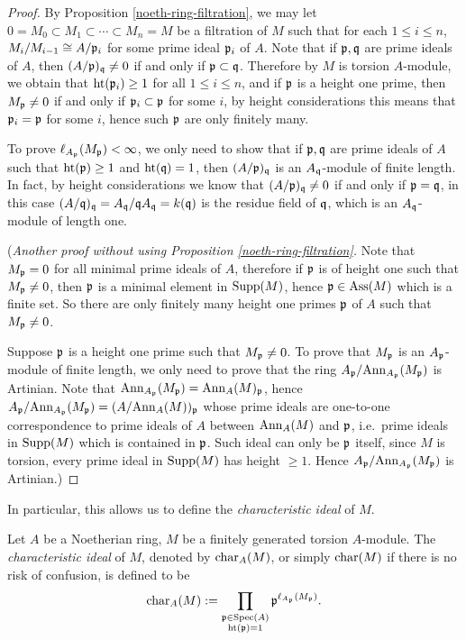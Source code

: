 \begin{proof}
By Proposition \ref{noeth-ring-filtration},
we may let $0=M_0\subset M_1\subset\cdots\subset M_n=M$ be a filtration of $M$
such that for each $1\leq i\leq n$,
$M_i/M_{i-1}\cong A/{\mathfrak{p}}_i$ for some prime ideal ${\mathfrak{p}}_i$ of $A$.
Note that if ${\mathfrak{p}},{\mathfrak{q}}$ are prime ideals of $A$,
then $(A/{\mathfrak{p}})_{\mathfrak{q}}\neq 0$ if and only if ${\mathfrak{p}}\subset{\mathfrak{q}}$.
Therefore by $M$ is torsion $A$-module, we obtain that ${\mathrm{ht}}({\mathfrak{p}}_i)\geq 1$
for all $1\leq i\leq n$,
and if ${\mathfrak{p}}$ is a height one prime, then $M_{\mathfrak{p}}\neq 0$
if and only if ${\mathfrak{p}}_i\subset{\mathfrak{p}}$ for some $i$,
by height considerations this means that ${\mathfrak{p}}_i={\mathfrak{p}}$ for some $i$,
hence such ${\mathfrak{p}}$ are only finitely many.

To prove $\ell_{A_{\mathfrak{p}}}(M_{\mathfrak{p}})<\infty$,
we only need to show that if ${\mathfrak{p}},{\mathfrak{q}}$ are prime ideals of $A$
such that ${\mathrm{ht}}({\mathfrak{p}})\geq 1$ and ${\mathrm{ht}}({\mathfrak{q}})=1$,
then $(A/{\mathfrak{p}})_{\mathfrak{q}}$ is an $A_{\mathfrak{q}}$-module of finite length.
In fact, by height considerations we know that $(A/{\mathfrak{p}})_{\mathfrak{q}}\neq 0$
if and only if ${\mathfrak{p}}={\mathfrak{q}}$, in this case $(A/{\mathfrak{q}})_{\mathfrak{q}}=A_{\mathfrak{q}}/{\mathfrak{q}} A_{\mathfrak{q}}
=k({\mathfrak{q}})$ is the residue field of ${\mathfrak{q}}$, which is
an $A_{\mathfrak{q}}$-module of length one.

(\emph{Another proof without using Proposition \ref{noeth-ring-filtration}.}
Note that $M_{\mathfrak{p}}=0$ for all minimal prime ideals of $A$,
therefore if ${\mathfrak{p}}$ is of height one such that $M_{\mathfrak{p}}\neq 0$,
then ${\mathfrak{p}}$ is a minimal element in ${\mathrm{Supp}}(M)$, hence ${\mathfrak{p}}\in\operatorname{Ass}(M)$
which is a finite set.
So there are only finitely
many height one primes ${\mathfrak{p}}$ of $A$ such that $M_{\mathfrak{p}}\neq 0$.

Suppose ${\mathfrak{p}}$ is a height one prime such that $M_{\mathfrak{p}}\neq 0$.
To prove that $M_{\mathfrak{p}}$ is an $A_{\mathfrak{p}}$-module of finite length,
we only need to prove that the ring $A_{\mathfrak{p}}/{\mathrm{Ann}}_{A_{\mathfrak{p}}}(M_{\mathfrak{p}})$
is Artinian. Note that ${\mathrm{Ann}}_{A_{\mathfrak{p}}}(M_{\mathfrak{p}})={\mathrm{Ann}}_A(M)_{\mathfrak{p}}$,
hence $A_{\mathfrak{p}}/{\mathrm{Ann}}_{A_{\mathfrak{p}}}(M_{\mathfrak{p}})=(A/{\mathrm{Ann}}_A(M))_{\mathfrak{p}}$
whose prime ideals are one-to-one correspondence to prime ideals
of $A$ between ${\mathrm{Ann}}_A(M)$ and ${\mathfrak{p}}$,
i.e.~prime ideals in ${\mathrm{Supp}}(M)$ which is contained in ${\mathfrak{p}}$.
Such ideal can only be ${\mathfrak{p}}$ itself,
since $M$ is torsion, every prime ideal in ${\mathrm{Supp}}(M)$ has height $\geq 1$.
Hence $A_{\mathfrak{p}}/{\mathrm{Ann}}_{A_{\mathfrak{p}}}(M_{\mathfrak{p}})$
is Artinian.)
\end{proof}

In particular, this allows us to define the \emph{characteristic ideal} of $M$.

\begin{definition}
\label{char-ideal}
Let $A$ be a Noetherian ring, $M$ be a
finitely generated torsion $A$-module.
The \emph{characteristic ideal} of $M$,
denoted by $\operatorname{char}_A(M)$, or simply $\operatorname{char}(M)$ if there is no risk of confusion, is defined to be
$$
\operatorname{char}_A(M):=\prod_{\substack{{\mathfrak{p}}\in{\mathrm{Spec}}(A)\\
{\mathrm{ht}}({\mathfrak{p}})=1}}{\mathfrak{p}}^{\ell_{A_{\mathfrak{p}}}(M_{\mathfrak{p}})}.
$$
\end{definition}

